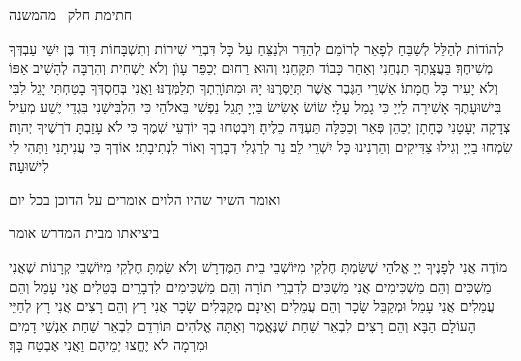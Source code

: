 \clearpage
\thispagestyle{empty}

{\centering
      \larger חתימת חלק  \sederCount\ מהמשנה

    }

    לְהוֹדוֹת לְהַלֵּל לְשַׁבֵּחַ לְפָאֵר לְרוֹמֵם לְהַדֵּר וּלְנַצֵּחַ עַל כָּל דִּבְרֵי שִׁירוֹת וְתִשְׁבָּחוֹת דָּוִד בֶּן יִשַּׁי עַבְדְּךָ מְשִׁיחֶךָ׃ בַּעֲצָֽתְךָ תַנְחֵנִי וְאַחַר כָּבוֹד תִּקָּחֵנִי׃
    וְהוּא רַחוּם יְכַפֵּר עָוֺן וְלֹא יַשְׁחִית וְהִרְבָּה לְהָשִׁיב אַפּוֹ וְלֹא יָעִיר כָּל חֲמָתוֹ׃
    אַשְׁרֵי הַגֶּבֶר אֲשֶׁר תְּיַסְּרֶנּוּ יָהּ וּמִתּוֹרָֽתְךָ תְלַמְּדֶנּוּ׃
    וַאֲנִי בְּחַסְדְּךָ בָטַחְתִּי יָגֵל לִבִּי בִּישׁוּעָתֶךָ אָשִׁירָה לַיְיָ כִּי גָמַל עָלָי׃
    שׂוֹשׂ אָשִׂישׂ בַּיְיָ תָּגֵל נַפְשִׁי בֵּאלֹהַי כִּי הִלְבִּישַׁנִי בִּגְדֵי יֶשַׁע מְעִיל צְדָקָה יְעָטָנִי כֶּחָתָן יְכַהֵן פְּאֵר וְכַכַּלָּה תַּעְדֶּה כֵלֶיהָ׃
    וְיִבְטְחוּ בְךָ יוֹדְעֵי שְׁמֶךָ כִּי לֹא עָזַבְתָּ דֹרְשֶׁיךָ יְהוָה׃
    שִׂמְחוּ בַיְיָ וְגִילוּ צַדִּיקִים וְהַרְנִינוּ כָּל יִשְׁרֵי לֵב׃
    נֵר לְרַגְלִי דְבָרֶךָ וְאוֹר לִנְתִיבָתִי׃
    אוֹדְךָ כִּי עֲנִיתָנִי וַתְּהִי לִי לִישׁוּעָה׃

    {\centering
    {\scriptsize    ואומר השיר שהיו הלוים אומרים על הדוכן בכל יום}

      \larger ביציאתו מבית המדרש אומר

    }

    מוֹדֶה אֲנִי לְפָנֶיךָ יְיָ אֱלֹהַי שֶׁשַּׂמְתָּ חֶלְקִי מִיּוֹשְׁבֵי בֵית הַמֶּדְרָשׁ וְלֹא שַׂמְתָּ חֶלְקִי מִיּוֹשְׁבֵי קְרָנוֹת
    שֶׁאֲנִי מַשְׁכִּים וְהֵם מַשְׁכִּימִים אֲנִי מַשְׁכִּים לְדִבְרֵי תוֹרָה וְהֵם מַשְׁכִּימִים לִדְבָרֵים בְּטֵלִים
    אֲנִי עָמֵל וְהֵם עֲמֵלִים אֲנִי עָמֵל וּמְקַבֵּל שָׂכָר וְהֵם עֲמֵלִים וְאֵינָם מְקַבְּלִים שָׂכָר
    אֲנִי רָץ וְהֵם רָצִים אֲנִי רָץ לְחַיֵּי הָעוֹלָם הַבָּא וְהֵם רָצִים לִבְאֵר שַׁחַת\hdot
    שֶׁנֶּאֱמֶר וְאַתָּה אֱלֹהִים תּוֹרִדֵם לִבְאֵר שַׁחַת אַנְשֵׁי דָמִים וּמִרְמָה לֹא יֶחֱצוּ יְמֵיהֶם וַאֲנִי אֶבְטַח בָּךְ׃

